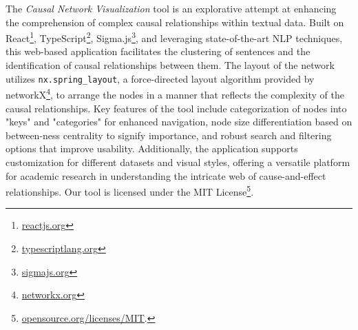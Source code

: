 


The \textit{Causal Network Visualization} tool is an explorative attempt at enhancing the comprehension of complex causal relationships within textual data. Built on React\footnote{\url{reactjs.org}}, TypeScript\footnote{\url{typescriptlang.org}}, Sigma.js\footnote{\url{sigmajs.org}}, and leveraging state-of-the-art NLP techniques, this web-based application facilitates the clustering of sentences and the identification of causal relationships between them. The layout of the network utilizes \texttt{nx.spring\_layout}, a force-directed layout algorithm provided by networkX\footnote{\url{networkx.org}}, to arrange the nodes in a manner that reflects the complexity of the causal relationships. Key features of the tool include categorization of nodes into "keys" and "categories" for enhanced navigation, node size differentiation based on between-ness centrality to signify importance, and robust search and filtering options that improve usability. Additionally, the application supports customization for different datasets and visual styles, offering a versatile platform for academic research in understanding the intricate web of cause-and-effect relationships. Our tool is licensed under the MIT License\footnote{\url{opensource.org/licenses/MIT}.}.

